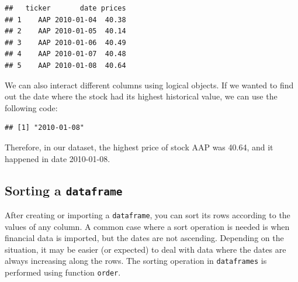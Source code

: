 \documentclass[11pt,]{book}
\newenvironment{Shaded}{\begin{snugshade}}{\end{snugshade}}
\newcommand{\KeywordTok}[1]{\textcolor[rgb]{0.27,0.27,0.27}{\textbf{#1}}}
\newcommand{\StringTok}[1]{\textcolor[rgb]{0.5,0.5,0.5}{#1}}
\newcommand{\CommentTok}[1]{\textcolor[rgb]{0.56,0.35,0.01}{\textit{#1}}}
\newcommand{\OperatorTok}[1]{\textcolor[rgb]{0.81,0.36,0.00}{\textbf{#1}}}
\newcommand{\NormalTok}[1]{#1}
\begin{document}
\begin{Shaded}
\end{Shaded}

\begin{verbatim}
##   ticker       date prices
## 1    AAP 2010-01-04  40.38
## 2    AAP 2010-01-05  40.14
## 3    AAP 2010-01-06  40.49
## 4    AAP 2010-01-07  40.48
## 5    AAP 2010-01-08  40.64
\end{verbatim}

We can also interact different columns using logical objects. If we
wanted to find out the date where the stock had its highest historical
value, we can use the following code:

\begin{Shaded}
\end{Shaded}

\begin{verbatim}
## [1] "2010-01-08"
\end{verbatim}

Therefore, in our dataset, the highest price of stock AAP was 40.64, and
it happened in date 2010-01-08.

\subsection{\texorpdfstring{Sorting a
\texttt{dataframe}}{Sorting a dataframe}}\label{sorting-a-dataframe}

After creating or importing a \texttt{dataframe}, you can sort its rows
according to the values of any column. A common case where a sort
operation is needed is when financial data is imported, but the dates
are not ascending. Depending on the situation, it may be easier (or
expected) to deal with data where the dates are always increasing along
the rows. The sorting operation in \texttt{dataframes} is performed
using function \texttt{order}. 
\end{document}
